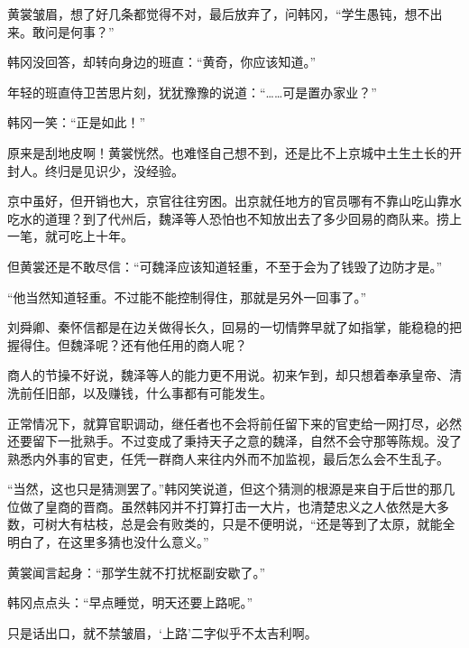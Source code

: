 黄裳皱眉，想了好几条都觉得不对，最后放弃了，问韩冈，“学生愚钝，想不出来。敢问是何事？”

韩冈没回答，却转向身边的班直：“黄奇，你应该知道。”

年轻的班直侍卫苦思片刻，犹犹豫豫的说道：“……可是置办家业？”

韩冈一笑：“正是如此！”

原来是刮地皮啊！黄裳恍然。也难怪自己想不到，还是比不上京城中土生土长的开封人。终归是见识少，没经验。

京中虽好，但开销也大，京官往往穷困。出京就任地方的官员哪有不靠山吃山靠水吃水的道理？到了代州后，魏泽等人恐怕也不知放出去了多少回易的商队来。捞上一笔，就可吃上十年。

但黄裳还是不敢尽信：“可魏泽应该知道轻重，不至于会为了钱毁了边防才是。”

“他当然知道轻重。不过能不能控制得住，那就是另外一回事了。”

刘舜卿、秦怀信都是在边关做得长久，回易的一切情弊早就了如指掌，能稳稳的把握得住。但魏泽呢？还有他任用的商人呢？

商人的节操不好说，魏泽等人的能力更不用说。初来乍到，却只想着奉承皇帝、清洗前任旧部，以及赚钱，什么事都有可能发生。

正常情况下，就算官职调动，继任者也不会将前任留下来的官吏给一网打尽，必然还要留下一批熟手。不过变成了秉持天子之意的魏泽，自然不会守那等陈规。没了熟悉内外事的官吏，任凭一群商人来往内外而不加监视，最后怎么会不生乱子。

“当然，这也只是猜测罢了。”韩冈笑说道，但这个猜测的根源是来自于后世的那几位做了皇商的晋商。虽然韩冈并不打算打击一大片，也清楚忠义之人依然是大多数，可树大有枯枝，总是会有败类的，只是不便明说，“还是等到了太原，就能全明白了，在这里多猜也没什么意义。”

黄裳闻言起身：“那学生就不打扰枢副安歇了。”

韩冈点点头：“早点睡觉，明天还要上路呢。”

只是话出口，就不禁皱眉，‘上路’二字似乎不太吉利啊。
